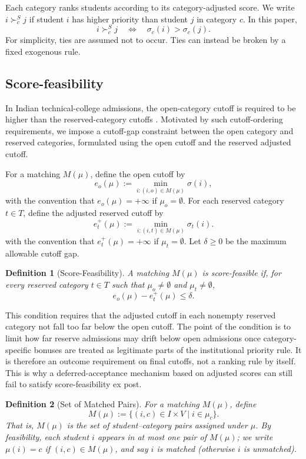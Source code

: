 \documentclass[10pt]{article}
\newtheorem{definition}{Definition}
\newcommand{\1}{\mathbf{1}}
\begin{document}
Each category ranks students according to its category-adjusted score. We write $i\succ_c^S j$ if student $i$ has higher priority than student $j$ in category $c$. In this paper,
\[
i\succ_c^S j
\quad \Longleftrightarrow \quad
\sigma_c(i)>\sigma_c(j).
\]
For simplicity, ties are assumed not to occur. Ties can instead be broken by a fixed exogenous rule.

\subsection{Score-feasibility}

In Indian technical-college admissions, the open-category cutoff is required to be higher than the reserved-category cutoffs \citep{AyTu23a}. Motivated by such cutoff-ordering requirements, we impose a cutoff-gap constraint between the open category and reserved categories, formulated using the open cutoff and the reserved adjusted cutoff.

For a matching $M(\mu)$, define the open cutoff by
\[
e_o(\mu):=\min_{i:(i,o)\in M(\mu)}\sigma(i),
\]
with the convention that $e_o(\mu)=+\infty$ if $\mu_o=\emptyset$. For each reserved category $t\in T$, define the adjusted reserved cutoff by
\[
e_t^+(\mu):=\min_{i:(i,t)\in M(\mu)}\sigma_t(i).
\]
with the convention that $e_t^+(\mu)=+\infty$ if $\mu_t=\emptyset$. Let $\delta\ge 0$ be the maximum allowable cutoff gap.

\begin{definition}[Score-Feasibility]
A matching $M(\mu)$ is score-feasible if, for every reserved category $t\in T$ such that $\mu_o\ne\emptyset$ and $\mu_t\ne\emptyset$,
\[
e_o(\mu)-e_t^+(\mu)\le \delta.
\]
\end{definition}

This condition requires that the adjusted cutoff in each nonempty reserved category not fall too far below the open cutoff. The point of the condition is to limit how far reserve admissions may drift below open admissions once category-specific bonuses are treated as legitimate parts of the institutional priority rule. It is therefore an outcome requirement on final cutoffs, not a ranking rule by itself. This is why a deferred-acceptance mechanism based on adjusted scores can still fail to satisfy score-feasibility ex post.


\begin{definition}[Set of Matched Pairs]
For a matching $M(\mu)$, define
\[
M(\mu) := \{(i,c)\in I\times V \mid i\in \mu_c\}.
\]
That is, $M(\mu)$ is the set of student–category pairs assigned under $\mu$. By feasibility, each student $i$ appears in at most one pair of $M(\mu)$; we write $\mu(i)=c$ if $(i,c)\in M(\mu)$, and say $i$ is \emph{matched} (otherwise $i$ is \emph{unmatched}).
\end{definition}
\end{document}
